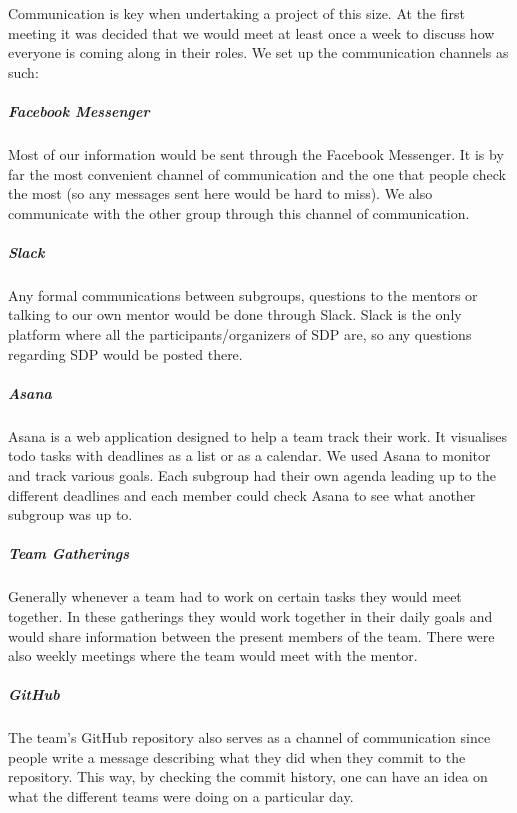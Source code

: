Communication is key when undertaking a project of this size. At the first meeting it was decided that we would meet at least once a week to discuss how everyone is coming along in their roles. We set up the communication channels as such:

\subparagraph{Facebook Messenger}
Most of our information would be sent through the Facebook Messenger. It is by far the most convenient channel of communication and the one that people check the most (so any messages sent here would be hard to miss). We also communicate with the other group through this channel of communication.
\subparagraph{Slack}
Any formal communications between subgroups, questions to the mentors or talking to our own mentor would be done through Slack. Slack is the only platform where all the participants/organizers of SDP are, so any questions regarding SDP would be posted there.
\subparagraph{Asana}
Asana is a web application designed to help a team track their work. It visualises todo tasks with deadlines as a list or as a calendar.
We used Asana to monitor and track various goals. Each subgroup had their own agenda leading up to the different deadlines and each member could check Asana to see what another subgroup was up to.
\subparagraph{Team Gatherings}
Generally whenever a team had to work on certain tasks they would meet together. In these gatherings they would work together in their daily goals and would share information between the present members of the team. There were also weekly meetings where the team would meet with the mentor.
\subparagraph{GitHub}
The team's GitHub repository also serves as a channel of communication since people write a message describing what they did when they commit to the repository. This way, by checking the commit history, one can have an idea on what the different teams were doing on a particular day.
